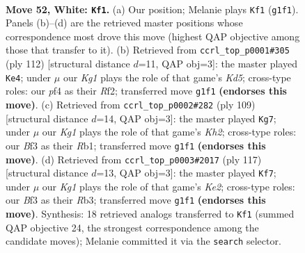 \documentclass[11pt]{article}
\begin{document}
\clearpage

\begin{figure}[p]\centering
\begin{subfigure}{0.46\textwidth}\centering
\resizebox{\linewidth}{!}{%
\newchessgame
\chessboard[
  setfen={1k6/8/8/4p1p1/5p2/5B2/1r6/6K1 w - - 15 52},
  showmover=false,
  pgfstyle=straightmove, color=movearrow, markmove={g1-f1}
]}
\caption{}
\end{subfigure}\hfill
\begin{subfigure}{0.46\textwidth}\centering
\resizebox{\linewidth}{!}{%
\newchessgame
\chessboard[
  setfen={8/4B3/r5k1/3K4/6p1/5p2/5R2/8 w - - 0 57},
  showmover=false,
  pgfstyle=straightmove, color=movearrow, markmove={d5-e4}
]}
\caption{}
\end{subfigure}
\\[4pt]
\begin{subfigure}{0.46\textwidth}\centering
\resizebox{\linewidth}{!}{%
\newchessgame
\chessboard[
  setfen={8/7k/8/6p1/6P1/5P2/R4K2/1r6 b - - 14 55},
  showmover=false,
  pgfstyle=straightmove, color=movearrow, markmove={h7-g7}
]}
\caption{}
\end{subfigure}\hfill
\begin{subfigure}{0.46\textwidth}\centering
\resizebox{\linewidth}{!}{%
\newchessgame
\chessboard[
  setfen={7R/4k3/8/4p3/7K/1r3P2/6P1/8 b - - 28 59},
  showmover=false,
  pgfstyle=straightmove, color=movearrow, markmove={e7-f7}
]}
\caption{}
\end{subfigure}
\caption{\textbf{Move 52, White: \texttt{Kf1}.} (a) Our position; Melanie plays \texttt{Kf1} (\texttt{g1f1}). Panels (b)--(d) are the retrieved master positions whose correspondence most drove this move (highest QAP objective among those that transfer to it). (b) Retrieved from \texttt{ccrl\_top\_p0001\#305} (ply 112) [structural distance $d$=11, QAP obj=3]: the master played \texttt{Ke4}; under $\mu$ our \emph{Kg1} plays the role of that game's \emph{Kd5}; cross-type roles: our \emph{p}f4 as their \emph{R}f2; transferred move \texttt{g1f1} \textbf{(endorses this move)}. (c) Retrieved from \texttt{ccrl\_top\_p0002\#282} (ply 109) [structural distance $d$=14, QAP obj=3]: the master played \texttt{Kg7}; under $\mu$ our \emph{Kg1} plays the role of that game's \emph{Kh2}; cross-type roles: our \emph{B}f3 as their \emph{R}b1; transferred move \texttt{g1f1} \textbf{(endorses this move)}. (d) Retrieved from \texttt{ccrl\_top\_p0003\#2017} (ply 117) [structural distance $d$=13, QAP obj=3]: the master played \texttt{Kf7}; under $\mu$ our \emph{Kg1} plays the role of that game's \emph{Ke2}; cross-type roles: our \emph{B}f3 as their \emph{R}b3; transferred move \texttt{g1f1} \textbf{(endorses this move)}. Synthesis: 18 retrieved analogs transferred to \texttt{Kf1} (summed QAP objective 24, the strongest correspondence among the candidate moves); Melanie committed it via the \texttt{search} selector.}
\label{fig:thought-m102}
\end{figure}
\end{document}
